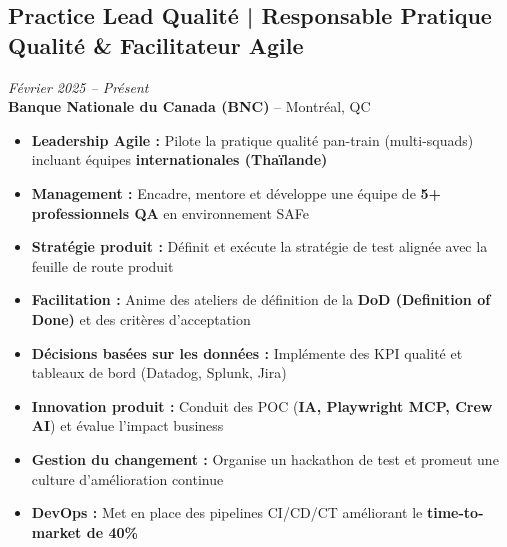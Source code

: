 \documentclass[11pt,a4paper]{article}
\newcommand{\highlight}[1]{\textcolor{primaryblue}{\textbf{#1}}}
\newcommand{\keypoint}[1]{\textbf{#1}}
\begin{document}
\subsection*{Practice Lead Qualité | Responsable Pratique Qualité \& Facilitateur Agile} \hfill \textit{\color{mediumgray}Février 2025 -- Présent}\\
\textcolor{primaryblue}{\textbf{Banque Nationale du Canada (BNC)}} -- Montréal, QC
\begin{itemize}[leftmargin=22pt]
    \item \highlight{Leadership Agile :} Pilote la pratique qualité pan-train (multi-squads) incluant équipes \textbf{internationales (Thaïlande)}
    \item \highlight{Management :} Encadre, mentore et développe une équipe de \keypoint{5+ professionnels QA} en environnement SAFe
    \item \highlight{Stratégie produit :} Définit et exécute la stratégie de test alignée avec la feuille de route produit
    \item \highlight{Facilitation :} Anime des ateliers de définition de la \textbf{DoD (Definition of Done)} et des critères d'acceptation
    \item \highlight{Décisions basées sur les données :} Implémente des KPI qualité et tableaux de bord (Datadog, Splunk, Jira)
    \item \highlight{Innovation produit :} Conduit des POC (\textbf{IA, Playwright MCP, Crew AI}) et évalue l'impact business
    \item \highlight{Gestion du changement :} Organise un hackathon de test et promeut une culture d'amélioration continue
    \item \highlight{DevOps :} Met en place des pipelines CI/CD/CT améliorant le \keypoint{time-to-market de 40\%}
\end{itemize}
\end{document}
